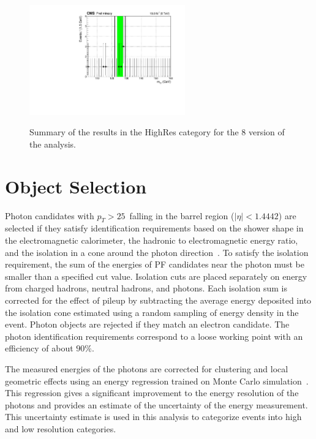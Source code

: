 \begin{figure}[ht!]
\centering
\includegraphics[width=0.6\textwidth,angle=0.]{hgg/HggMassPlot_HighRes_8TeV.pdf}\\
\caption{Summary of the  results in the HighRes category for the 8\TeV
  version of the analysis.
       \label{hgg:mgg8TeV}}
\end{figure}
\section{Object Selection}\label{sec:ObjectSelection}


Photon candidates with $p_{T}>25$~\GeV falling in the barrel region ($|\eta|<1.4442$) are selected if 
they satisfy identification requirements based on the shower shape in the electromagnetic calorimeter, the hadronic to
electromagnetic energy ratio, and the isolation in a cone around the photon direction~\cite{Khachatryan:2014ira}. 
To satisfy the isolation requirement, the sum of the energies of PF candidates near the photon must be 
smaller than a specified cut value.  Isolation cuts are placed separately on energy from charged hadrons, 
neutral hadrons, and photons.  Each isolation sum is corrected for the effect of pileup by subtracting the
average energy deposited into the isolation cone estimated using a random
sampling of energy density in the event. Photon objects are rejected if 
they match an electron candidate. The photon identification requirements correspond to a loose working 
point with an efficiency of about $90\%$.


The measured energies of the photons are corrected for clustering and local
geometric effects using an energy regression trained on
 Monte Carlo simulation~\cite{Khachatryan:2015iwa}. This regression gives a significant
improvement to the energy resolution of the photons and provides an estimate of the uncertainty of the energy measurement. 
This uncertainty estimate is used in this analysis to categorize events into high and low resolution categories. 


